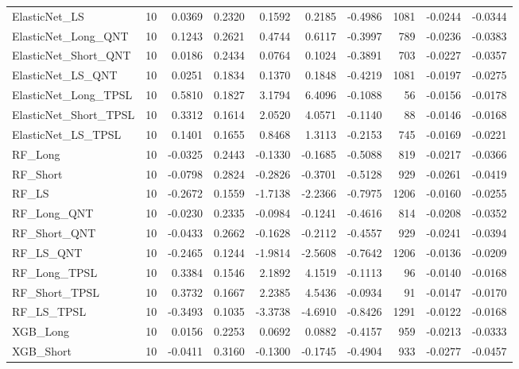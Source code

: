 \begin{tabular}{llrrrrrrrr}
\cline{1-10}
ElasticNet\_LS & 10 & 0.0369 & 0.2320 & 0.1592 & 0.2185 & -0.4986 & 1081 & -0.0244 & -0.0344 \\
\cline{1-10}
ElasticNet\_Long\_QNT & 10 & 0.1243 & 0.2621 & 0.4744 & 0.6117 & -0.3997 & 789 & -0.0236 & -0.0383 \\
\cline{1-10}
ElasticNet\_Short\_QNT & 10 & 0.0186 & 0.2434 & 0.0764 & 0.1024 & -0.3891 & 703 & -0.0227 & -0.0357 \\
\cline{1-10}
ElasticNet\_LS\_QNT & 10 & 0.0251 & 0.1834 & 0.1370 & 0.1848 & -0.4219 & 1081 & -0.0197 & -0.0275 \\
\cline{1-10}
ElasticNet\_Long\_TPSL & 10 & 0.5810 & 0.1827 & 3.1794 & 6.4096 & -0.1088 & 56 & -0.0156 & -0.0178 \\
\cline{1-10}
ElasticNet\_Short\_TPSL & 10 & 0.3312 & 0.1614 & 2.0520 & 4.0571 & -0.1140 & 88 & -0.0146 & -0.0168 \\
\cline{1-10}
ElasticNet\_LS\_TPSL & 10 & 0.1401 & 0.1655 & 0.8468 & 1.3113 & -0.2153 & 745 & -0.0169 & -0.0221 \\
\cline{1-10}
RF\_Long & 10 & -0.0325 & 0.2443 & -0.1330 & -0.1685 & -0.5088 & 819 & -0.0217 & -0.0366 \\
\cline{1-10}
RF\_Short & 10 & -0.0798 & 0.2824 & -0.2826 & -0.3701 & -0.5128 & 929 & -0.0261 & -0.0419 \\
\cline{1-10}
RF\_LS & 10 & -0.2672 & 0.1559 & -1.7138 & -2.2366 & -0.7975 & 1206 & -0.0160 & -0.0255 \\
\cline{1-10}
RF\_Long\_QNT & 10 & -0.0230 & 0.2335 & -0.0984 & -0.1241 & -0.4616 & 814 & -0.0208 & -0.0352 \\
\cline{1-10}
RF\_Short\_QNT & 10 & -0.0433 & 0.2662 & -0.1628 & -0.2112 & -0.4557 & 929 & -0.0241 & -0.0394 \\
\cline{1-10}
RF\_LS\_QNT & 10 & -0.2465 & 0.1244 & -1.9814 & -2.5608 & -0.7642 & 1206 & -0.0136 & -0.0209 \\
\cline{1-10}
RF\_Long\_TPSL & 10 & 0.3384 & 0.1546 & 2.1892 & 4.1519 & -0.1113 & 96 & -0.0140 & -0.0168 \\
\cline{1-10}
RF\_Short\_TPSL & 10 & 0.3732 & 0.1667 & 2.2385 & 4.5436 & -0.0934 & 91 & -0.0147 & -0.0170 \\
\cline{1-10}
RF\_LS\_TPSL & 10 & -0.3493 & 0.1035 & -3.3738 & -4.6910 & -0.8426 & 1291 & -0.0122 & -0.0168 \\
\cline{1-10}
XGB\_Long & 10 & 0.0156 & 0.2253 & 0.0692 & 0.0882 & -0.4157 & 959 & -0.0213 & -0.0333 \\
\cline{1-10}
XGB\_Short & 10 & -0.0411 & 0.3160 & -0.1300 & -0.1745 & -0.4904 & 933 & -0.0277 & -0.0457 \\

\end{tabular}
